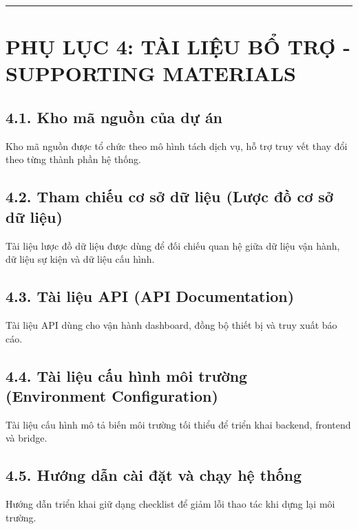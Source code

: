 \documentclass[a4paper]{extarticle}
\newcommand{\appendixsection}[1]{\clearpage\section{#1}}
\begin{document}
\begin{center}\rule{0.5\linewidth}{0.5pt}\end{center}

\appendixsection{PHỤ LỤC 4: TÀI LIỆU BỔ TRỢ - SUPPORTING MATERIALS}

\subsection{4.1. Kho mã nguồn của dự án}

Kho mã nguồn được tổ chức theo mô hình tách dịch vụ, hỗ trợ truy vết thay đổi theo từng thành phần hệ thống.

\subsection{4.2. Tham chiếu cơ sở dữ liệu (Lược đồ cơ sở dữ liệu)}

Tài liệu lược đồ dữ liệu được dùng để đối chiếu quan hệ giữa dữ liệu vận hành, dữ liệu sự kiện và dữ liệu cấu hình.

\subsection{4.3. Tài liệu API (API Documentation)}

Tài liệu API dùng cho vận hành dashboard, đồng bộ thiết bị và truy xuất báo cáo.

\subsection{4.4. Tài liệu cấu hình môi trường (Environment Configuration)}

Tài liệu cấu hình mô tả biến môi trường tối thiểu để triển khai backend, frontend và bridge.

\subsection{4.5. Hướng dẫn cài đặt và chạy hệ thống}

Hướng dẫn triển khai giữ dạng checklist để giảm lỗi thao tác khi dựng lại môi trường.
\end{document}
